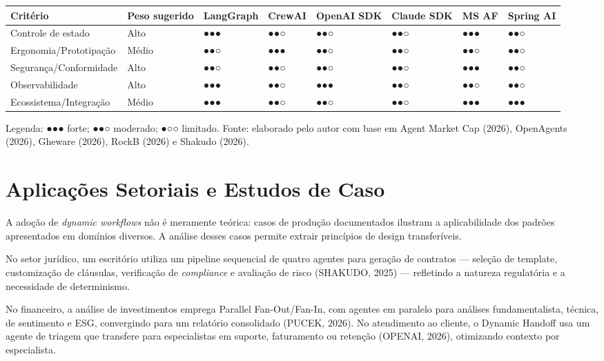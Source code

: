 \documentclass[12pt,a4paper]{article}
\begin{document}
\begin{center}
{\footnotesize
\setlength{\tabcolsep}{4pt}
\begin{tabularx}{\linewidth}{>{\raggedright\arraybackslash}X>{\centering\arraybackslash}X>{\centering\arraybackslash}X>{\centering\arraybackslash}X>{\centering\arraybackslash}X>{\centering\arraybackslash}X>{\centering\arraybackslash}X>{\centering\arraybackslash}X}
\toprule
\textbf{Critério} & \textbf{Peso sugerido} & \textbf{LangGraph} & \textbf{CrewAI} & \textbf{OpenAI SDK} & \textbf{Claude SDK} & \textbf{MS AF} & \textbf{Spring AI} \\
\midrule
Controle de estado & Alto & ●●● & ●●○ & ●●○ & ●●○ & ●●● & ●●○ \\
Ergonomia/Prototipação & Médio & ●●○ & ●●● & ●●○ & ●●○ & ●●○ & ●●○ \\
Segurança/Conformidade & Alto & ●●○ & ●●○ & ●●○ & ●●○ & ●●● & ●●○ \\
Observabilidade & Alto & ●●● & ●●○ & ●●● & ●●○ & ●●○ & ●●○ \\
Ecossistema/Integração & Médio & ●●● & ●●○ & ●●○ & ●●○ & ●●● & ●●● \\
\bottomrule
\end{tabularx}
}
\end{center}

Legenda: ●●● forte; ●●○ moderado; ●○○ limitado. Fonte: elaborado pelo autor com base em Agent Market Cap (2026), OpenAgents (2026), Gheware (2026), RockB (2026) e Shakudo (2026).


\section{Aplicações Setoriais e Estudos de Caso}

A adoção de \textit{dynamic workflows} não é meramente teórica: casos de produção documentados ilustram a aplicabilidade dos padrões apresentados em domínios diversos. A análise desses casos permite extrair princípios de design transferíveis.

No setor jurídico, um escritório utiliza um pipeline sequencial de quatro agentes para geração de contratos — seleção de template, customização de cláusulas, verificação de \textit{compliance} e avaliação de risco (SHAKUDO, 2025) — refletindo a natureza regulatória e a necessidade de determinismo.

No financeiro, a análise de investimentos emprega Parallel Fan-Out/Fan-In, com agentes em paralelo para análises fundamentalista, técnica, de sentimento e ESG, convergindo para um relatório consolidado (PUCEK, 2026). No atendimento ao cliente, o Dynamic Handoff usa um agente de triagem que transfere para especialistas em suporte, faturamento ou retenção (OPENAI, 2026), otimizando contexto por especialista.
\end{document}
